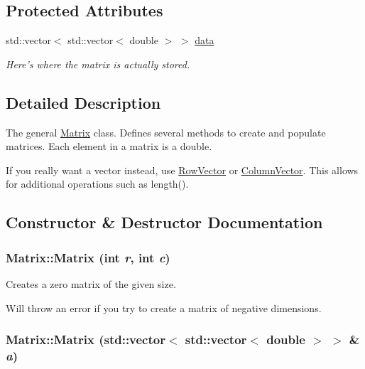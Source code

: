 \subsection*{Protected Attributes}
\begin{DoxyCompactItemize}
\item 
std::vector$<$ std::vector$<$ double $>$ $>$ \hyperlink{class_matrix_adab4557133e13b08ae470a8e5df7b99c}{data}
\begin{DoxyCompactList}\small\item\em Here's where the matrix is actually stored. \item\end{DoxyCompactList}\end{DoxyCompactItemize}


\subsection{Detailed Description}
The general \hyperlink{class_matrix}{Matrix} class. Defines several methods to create and populate matrices. Each element in a matrix is a double.

If you really want a vector instead, use \hyperlink{class_row_vector}{RowVector} or \hyperlink{class_column_vector}{ColumnVector}. This allows for additional operations such as length(). 

\subsection{Constructor \& Destructor Documentation}
\hypertarget{class_matrix_a07a3cee5bc286ca27ceffe81ce5a2d01}{
\subsubsection[{Matrix}]{\setlength{\rightskip}{0pt plus 5cm}Matrix::Matrix (int {\em r}, \/  int {\em c})}}
\label{class_matrix_a07a3cee5bc286ca27ceffe81ce5a2d01}


Creates a zero matrix of the given size. 

Will throw an error if you try to create a matrix of negative dimensions. \hypertarget{class_matrix_a0db283ef4ea2660f8d0c1b58f9e74f49}{
\subsubsection[{Matrix}]{\setlength{\rightskip}{0pt plus 5cm}Matrix::Matrix (std::vector$<$ std::vector$<$ double $>$ $>$ \& {\em a})}}
\label{class_matrix_a0db283ef4ea2660f8d0c1b58f9e74f49}


